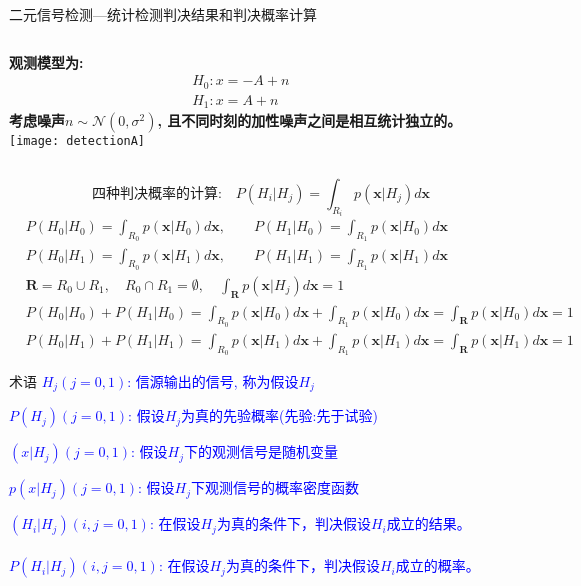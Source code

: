 \begin{frame}[shrink]{二元信号检测---统计检测判决结果和判决概率计算}
\begin{columns}
	\textbf{观测模型为:}
	\begin{align*}
	&H_0: x=-A+n\\
	&H_1: x=A+n
	\end{align*}
	\textbf{考虑噪声$n\sim\mathcal{N}(0,\sigma^2)$, 且不同时刻的加性噪声之间是相互统计独立的。}\\
	\texttt{[image: detectionA]}
\end{columns}
\[\text{四种判决概率的计算:}\quad P(H_i|H_j)=\int_{R_i}p(\bm{x}|H_j)d\bm{x} \]
\begin{align*}
&P(H_0|H_0)=\int_{R_0}p(\bm{x}|H_0)d\bm{x},\qquad P(H_1|H_0)=\int_{R_1}p(\bm{x}|H_0)d\bm{x}\\
&P(H_0|H_1)=\int_{R_0}p(\bm{x}|H_1)d\bm{x},\qquad P(H_1|H_1)=\int_{R_1}p(\bm{x}|H_1)d\bm{x}\\
&\bm{R}=R_0\cup R_1,\quad R_0\cap R_1=\emptyset, \quad \int_{\bm{R}}p(\bm{x}|H_j)d\bm{x}=1\\
&P(H_0|H_0)+P(H_1|H_0)=\int_{R_0}p(\bm{x}|H_0)d\bm{x}+\int_{R_1}p(\bm{x}|H_0)d\bm{x}=\int_{\bm{R}}p(\bm{x}|H_0)d\bm{x}=1\\
&P(H_0|H_1)+P(H_1|H_1)=\int_{R_0}p(\bm{x}|H_1)d\bm{x}+\int_{R_1}p(\bm{x}|H_1)d\bm{x}=\int_{\bm{R}}p(\bm{x}|H_1)d\bm{x}=1
\end{align*}
\end{frame}

\begin{frame}{术语}
\textcolor{blue}{$H_j(j=0,1)$: 信源输出的信号, 称为假设$H_j$}

\bigskip

\textcolor{blue}{$P(H_j)(j=0,1)$: 假设$H_j$为真的先验概率(先验:先于试验)}


\bigskip
\textcolor{blue}{$(x|H_j)(j=0,1)$: 假设$H_j$下的观测信号是随机变量}

\bigskip

\textcolor{blue}{$p(x|H_j)(j=0,1)$: 假设$H_j$下观测信号的概率密度函数}

\bigskip

\textcolor{blue}{$(H_i|H_j)(i,j=0,1)$: 在假设$H_j$为真的条件下，判决假设$H_i$成立的结果。}\\
~\\
\textcolor{blue}{$P(H_i|H_j)(i,j=0,1)$: 在假设$H_j$为真的条件下，判决假设$H_i$成立的概率。}\\
\end{frame}

